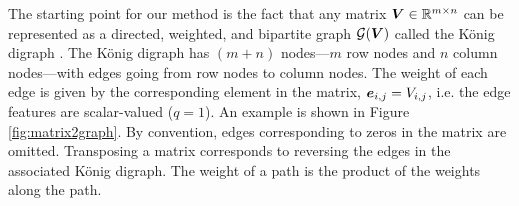 \documentclass{article}
\begin{document}
The starting point for our method is the fact that any matrix ${\bm{V}}\in\mathbb{R}^{m\times n}$ can be represented as a directed, weighted, and bipartite graph ${\mathcal{G}}({\bm{V}})$ called the König digraph \citep{Doob1984}. The König digraph has $(m+n)$ nodes---$m$ row nodes and $n$ column nodes---with edges going from row nodes to column nodes.  The weight of each edge is given by the corresponding element in the matrix, ${\bm{e}}_{i,j}={V}_{i,j}$, i.e. the edge features are scalar-valued ($q=1$). 
An example is shown in Figure \ref{fig:matrix2graph}. By convention, edges corresponding to zeros in the matrix are omitted.
Transposing a matrix corresponds to reversing the edges in the associated König digraph. The weight of a path is the product of the weights along the path.
\end{document}
